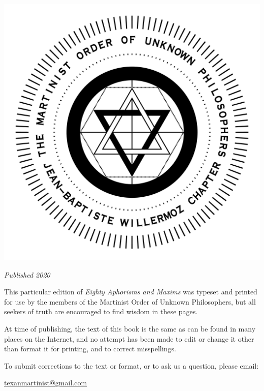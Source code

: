 \documentclass[b6paper,openany,12pt]{book}
\newcommand{\blankpage}{
	\newpage
	\thispagestyle{empty}
	\mbox{}
	\newpage
}
\newcommand{\eachpageornament}{%
	\begin{tikzpicture}[remember picture, overlay]
	\node[anchor=north, rotate=45] at ([shift=(-45:1em)] current page.north west){%
		\pgfornament[opacity=0.1, width=2\secheight]{6}};
	\node[anchor=north, rotate=-45] at ([shift=(-135:1em)] current page.north east){%
		\pgfornament[opacity=0.1, width=2\secheight]{6}};
	\node[anchor=north, rotate=135] at ([shift=(45:1em)] current page.south west){%
		\pgfornament[opacity=0.1, width=2\secheight]{6}};
	\node[anchor=north, rotate=-135] at ([shift=(135:1em)] current page.south east){%
		\pgfornament[opacity=0.1, width=2\secheight]{6}};
	\end{tikzpicture}
}
\newcommand{\eachpageornament}{%
	\begin{tikzpicture}[remember picture, overlay]
	\node[anchor=south, rotate=0] at ([shift=(90:1em)] current page.south){%
		\pgfornament[opacity=0.25, height=2\secheight]{69}};
	\node[anchor=south, rotate=180] at ([shift=(270:1em)] current page.north){%
		\pgfornament[opacity=0.25, height=2\secheight]{69}};
	\end{tikzpicture}
}
\begin{document}
	\begin{center}
		\includegraphics[width=\textwidth]{graphics/jbw_seal_2000px.png}\\\bigskip
		
		\textit{Published 2020}
	\end{center}
	
	\vspace*{\fill}
	
	\blankpage
	
	\vspace*{\fill}
		
	This particular edition of \textit{Eighty Aphorisms and Maxims} was typeset and printed for use by the members of the Martinist Order of Unknown Philosophers, but all seekers of truth are encouraged to find wisdom in these pages.
	
	At time of publishing, the text of this book is the same as can be found in many places on the Internet, and no attempt has been made to edit or change it other than format it for printing, and to correct misspellings.
	
	To submit corrections to the text or format, or to ask us a question, please email: 
	
	\url{texanmartinist@gmail.com}
	
	\vspace*{\fill}
	
\end{document}
